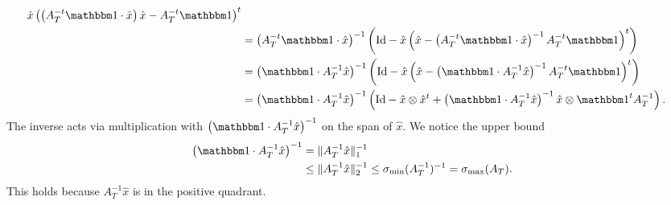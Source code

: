 \documentclass[10pt,a4paper]{article}
\begin{document}
\begin{itemize}
\begin{align*}
            \hat x 
            \left( 
                \left( A_{T}^{-t} \vecone \cdot \hat x \right) \hat x
                -
                A_{T}^{-t} \vecone
            \right)^{t} 
            \\&= 
            \left( A_{T}^{-t} \vecone \cdot \hat x \right)^{-1}
            \left( 
                \Id
                - 
                \hat x 
                \left( 
                    \hat x
                    -
                    \left( A_{T}^{-t} \vecone \cdot \hat x \right)^{-1}
                    A_{T}^{-t} \vecone
                \right)^{t}
            \right)
            \\&= 
            \left( \vecone \cdot A_{T}^{-1} \hat x \right)^{-1}
            \left( 
                \Id
                - 
                \hat x 
                \left( 
                    \hat x
                    -
                    \left( \vecone \cdot A_{T}^{-1} \hat x \right)^{-1}
                    A_{T}^{-t} \vecone
                \right)^{t}
            \right)
            \\&= 
            \left( \vecone \cdot A_{T}^{-1} \hat x \right)^{-1}
            \left( 
                \Id - \hat x \otimes \hat x^{t}
                + 
                \left( \vecone \cdot A_{T}^{-1} \hat x \right)^{-1}
                \hat x \otimes \vecone^{t} A_{T}^{-1}
            \right)
            .
        \end{align*}
        The inverse acts via multiplication with $\left( \vecone \cdot A_{T}^{-1} \hat x \right)^{-1}$ on the span of $\hat x$.
        We notice the upper bound 
        \begin{align*}
            \left( \vecone \cdot A_{T}^{-1} \hat x \right)^{-1}
            &= 
            \| A_{T}^{-1} \hat x \|^{-1}_{1}
            \\&\leq  
            \| A_{T}^{-1} \hat x \|^{-1}_{2}
            \leq 
            \sigma_{\min}( A_{T}^{-1} )^{-1}
            = 
            \sigma_{\max}( A_{T} )
            .
        \end{align*}
        This holds because $A_{T}^{-1} \hat x$ is in the positive quadrant.

\end{itemize}
\end{document}
